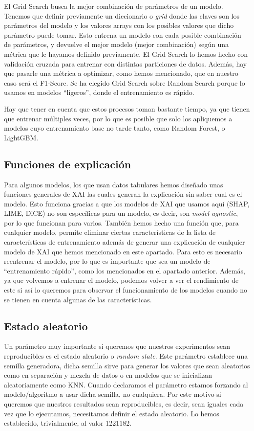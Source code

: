 El Grid Search busca la mejor combinación de parámetros de un modelo. Tenemos que definir previamente un diccionario o \textit{grid} donde las claves son los parámetros del modelo y los valores arrays con los posibles valores que dicho parámetro puede tomar. Esto entrena un modelo con cada posible combinación de parámetros, y devuelve el mejor modelo (mejor combinación) según una métrica que le hayamos definido previamente. El Grid Search lo hemos hecho con validación cruzada para entrenar con distintas particiones de datos. Además, hay que pasarle una métrica a optimizar, como hemos mencionado, que en nuestro caso será el F1-Score. Se ha elegido Grid Search sobre Random Search porque lo usamos en modelos ``ligeros'', donde el entrenamiento es rápido.

Hay que tener en cuenta que estos procesos toman bastante tiempo, ya que tienen que entrenar múltiples veces, por lo que es posible que solo los apliquemos a modelos cuyo entrenamiento base no tarde tanto, como Random Forest, o LightGBM. 

\subsection{Funciones de explicación}

Para algunos modelos, los que usan datos tabulares hemos diseñado unas funciones generales de XAI las cuales generan la explicación sin saber cual es el modelo. Esto funciona gracias a que los modelos de XAI que usamos aquí (SHAP, LIME, DiCE) no son específicas para un modelo, es decir, son \textit{model agnostic}, por lo que funcionan para varios. También hemos hecho una función que, para cualquier modelo, permite eliminar ciertas características de la lista de características de entrenamiento además de generar una explicación de cualquier modelo de XAI que hemos mencionado en este apartado. Para esto es necesario reentrenar el modelo, por lo que es importante que sea un modelo de ``entrenamiento rápido'', como los mencionados en el apartado anterior. Además, ya que volvemos a entrenar el modelo, podemos volver a ver el rendimiento de este si así lo queremos para observar el funcionamiento de los modelos cuando no se tienen en cuenta algunas de las características.

\subsection{Estado aleatorio}

Un parámetro muy importante si queremos que nuestros experimentos sean reproducibles es el estado aleatorio o \textit{random state}. Este parámetro establece una semilla generadora, dicha semilla sirve para generar los valores que sean aleatorios como en separación y mezcla de datos o en modelos que se inicializan aleatoriamente como KNN. Cuando declaramos el parámetro estamos forzando al modelo/algoritmo a usar dicha semilla, no cualquiera. Por este motivo si queremos que nuestros resultados sean reproducibles, es decir, sean iguales cada vez que lo ejecutamos, necesitamos definir el estado aleatorio. Lo hemos establecido, trivialmente, al valor 1221182.